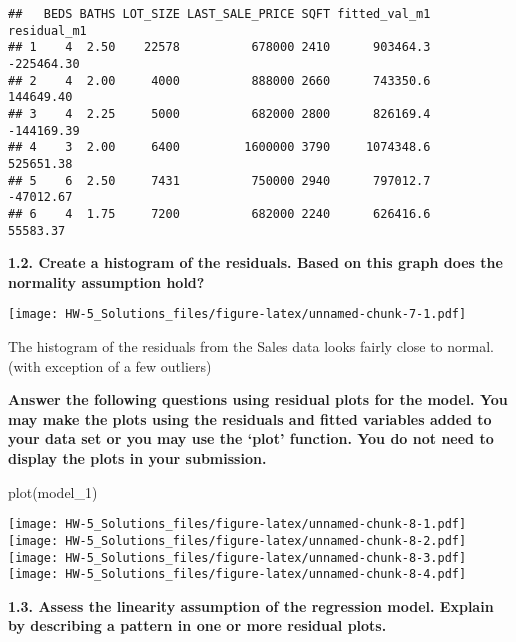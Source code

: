 \documentclass[
]{article}
\newenvironment{Shaded}{\begin{snugshade}}{\end{snugshade}}
\newcommand{\AttributeTok}[1]{\textcolor[rgb]{0.77,0.63,0.00}{#1}}
\newcommand{\DecValTok}[1]{\textcolor[rgb]{0.00,0.00,0.81}{#1}}
\newcommand{\FunctionTok}[1]{\textcolor[rgb]{0.00,0.00,0.00}{#1}}
\newcommand{\NormalTok}[1]{#1}
\newcommand{\SpecialCharTok}[1]{\textcolor[rgb]{0.00,0.00,0.00}{#1}}
\begin{document}
\begin{verbatim}
##   BEDS BATHS LOT_SIZE LAST_SALE_PRICE SQFT fitted_val_m1 residual_m1
## 1    4  2.50    22578          678000 2410      903464.3  -225464.30
## 2    4  2.00     4000          888000 2660      743350.6   144649.40
## 3    4  2.25     5000          682000 2800      826169.4  -144169.39
## 4    3  2.00     6400         1600000 3790     1074348.6   525651.38
## 5    6  2.50     7431          750000 2940      797012.7   -47012.67
## 6    4  1.75     7200          682000 2240      626416.6    55583.37
\end{verbatim}

\textbf{1.2. Create a histogram of the residuals. Based on this graph
does the normality assumption hold?}

\begin{Shaded}
\end{Shaded}

\texttt{[image: HW-5\_Solutions\_files/figure-latex/unnamed-chunk-7-1.pdf]}

The histogram of the residuals from the Sales data looks fairly close to
normal.(with exception of a few outliers)

\textbf{Answer the following questions using residual plots for the
model. You may make the plots using the residuals and fitted variables
added to your data set or you may use the `plot' function. You do not
need to display the plots in your submission.}

\begin{Shaded}
\begin{Highlighting}[]
\FunctionTok{plot}\NormalTok{(model\_1)}
\end{Highlighting}
\end{Shaded}

\texttt{[image: HW-5\_Solutions\_files/figure-latex/unnamed-chunk-8-1.pdf]}
\texttt{[image: HW-5\_Solutions\_files/figure-latex/unnamed-chunk-8-2.pdf]}
\texttt{[image: HW-5\_Solutions\_files/figure-latex/unnamed-chunk-8-3.pdf]}
\texttt{[image: HW-5\_Solutions\_files/figure-latex/unnamed-chunk-8-4.pdf]}

\textbf{1.3. Assess the linearity assumption of the regression model.
Explain by describing a pattern in one or more residual plots. }
\end{document}
